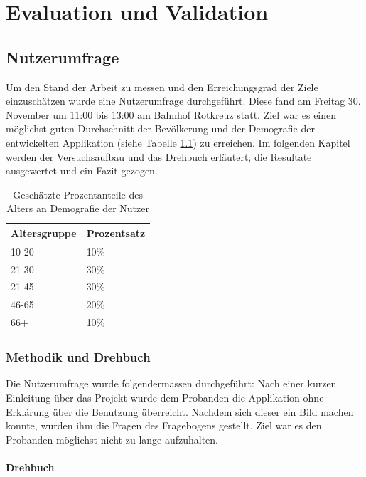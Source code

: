 \documentclass[a4paper]{scrreprt}
\begin{document}
\chapter{Evaluation und Validation}
\section{Nutzerumfrage}
Um den Stand der Arbeit zu messen und den Erreichungsgrad der Ziele einzuschätzen wurde eine Nutzerumfrage durchgeführt. Diese fand am Freitag 30. November um 11:00 bis 13:00 am Bahnhof Rotkreuz statt. Ziel war es einen möglichst guten Durchschnitt der Bevölkerung und der Demografie der entwickelten Applikation (siehe Tabelle \ref{tab:UserDemografie}) zu erreichen. Im folgenden Kapitel werden der Versuchsaufbau und das Drehbuch erläutert, die Resultate ausgewertet und ein Fazit gezogen.

\begin{table}[htb]
	\centering
	\begin{tabular}{|p{}|p{}|}
		\hline
		\textbf{Altersgruppe} & \textbf{Prozentsatz} \\
		\hline
		10-20 & 10\% \\
		\hline
		21-30 & 30\% \\
		\hline
		21-45 & 30\% \\
		\hline
		46-65 & 20\% \\
		\hline
		66+ & 10\% \\
		\hline
	\end{tabular}
	\label{tab:UserDemografie}
	\caption{Geschätzte Prozentanteile des Alters an Demografie der Nutzer}
\end{table}

\subsection{Methodik und Drehbuch}
Die Nutzerumfrage wurde folgendermassen durchgeführt: Nach einer kurzen Einleitung über das Projekt wurde dem Probanden die Applikation ohne Erklärung über die Benutzung überreicht. Nachdem sich dieser ein Bild machen konnte, wurden ihm die Fragen des Fragebogens gestellt. Ziel war es den Probanden möglichst nicht zu lange aufzuhalten.

\subsubsection{Drehbuch}
\end{document}
